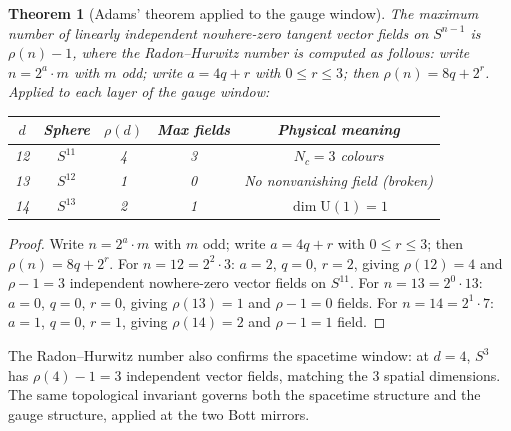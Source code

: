\documentclass[12pt,a4paper]{article}
\newtheorem{theorem}{Theorem}[section]
\begin{document}
\begin{theorem}[Adams' theorem applied to the gauge window]\label{thm:adams}
The maximum number of linearly independent nowhere-zero tangent vector fields on $S^{n-1}$
is $\rho(n)-1$, where the Radon--Hurwitz number is computed as follows: write $n=2^a\cdot m$
with $m$ odd; write $a=4q+r$ with $0\leq r\leq 3$; then $\rho(n)=8q+2^r$.
Applied to each layer of the gauge window:
\begin{center}
\begin{tabular}{ccccc}
\toprule
$d$ & Sphere & $\rho(d)$ & Max fields & Physical meaning \\
\midrule
12 & $S^{11}$ & 4 & 3 & $N_c=3$ colours \\
13 & $S^{12}$ & 1 & 0 & No nonvanishing field (broken) \\
14 & $S^{13}$ & 2 & 1 & $\dim\mathrm{U}(1)=1$ \\
\bottomrule
\end{tabular}
\end{center}
\end{theorem}
\begin{proof}
Write $n=2^a\cdot m$ with $m$ odd; write $a=4q+r$ with $0\leq r\leq 3$; then
$\rho(n)=8q+2^r$. For $n=12=2^2\cdot 3$: $a=2$, $q=0$, $r=2$, giving $\rho(12)=4$ and
$\rho-1=3$ independent nowhere-zero vector fields on $S^{11}$. For $n=13=2^0\cdot 13$:
$a=0$, $q=0$, $r=0$, giving $\rho(13)=1$ and $\rho-1=0$ fields. For $n=14=2^1\cdot 7$:
$a=1$, $q=0$, $r=1$, giving $\rho(14)=2$ and $\rho-1=1$ field.
\end{proof}

The Radon--Hurwitz number also confirms the spacetime window: at $d=4$, $S^3$ has
$\rho(4)-1=3$ independent vector fields, matching the 3 spatial dimensions. The same
topological invariant governs both the spacetime structure and the gauge structure, applied
at the two Bott mirrors.
\end{document}
